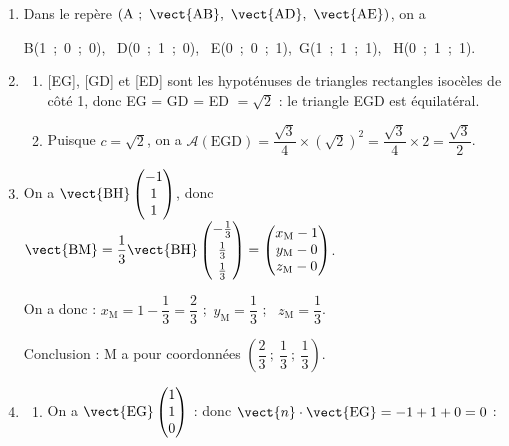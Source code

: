 \begin{enumerate}
\item 
Dans le repère $\left(\text{A}~;~\vect{\text{AB}},~\vect{\text{AD}},~\vect{\text{AE}}\right)$, on a 

B(1~;~0~;~0), \, D(0~;~1~;~0), \, E(0~;~0~;~1),\, G(1~;~1~;~1), \, H(0~;~1~;~1).
\item 
	\begin{enumerate}
		\item{}  
[EG], [GD] et [ED] sont les hypoténuses de triangles rectangles isocèles de côté 1, donc EG = GD = ED $= \sqrt{2}$ : le triangle EGD est équilatéral.
		\item 
		

Puisque $c = \sqrt{2}$, on a $\mathcal{A}(\text{EGD}) = \dfrac{\sqrt{3}}{4}\times \left(\sqrt{2}\right)^2 = \dfrac{\sqrt{3}}{4}\times 2 = \dfrac{\sqrt{3}}{2}$.
	\end{enumerate}
	
\item 

On a $\vect{\text{BH}}\begin{pmatrix}- 1\\1\\1\end{pmatrix}$, donc $\vect{\text{BM}} = \dfrac{1}{3}\vect{\text{BH}}\begin{pmatrix}- \frac{1}{3}\\[3pt]\frac{1}{3}\\[3pt]\frac{1}{3}\end{pmatrix} = \begin{pmatrix}x_{\text{M}} - 1\\y_{\text{M}}- 0\\z_{\text{M}}- 0\end{pmatrix}$.

On a donc : 
$x_{\text{M}} = 1 - \dfrac{1}{3} = \dfrac{2}{3}$ ;\,
$y_{\text{M}} = \dfrac{1}{3} $ ; \,
$z_{\text{M}} = \dfrac{1}{3}$.

Conclusion : M a pour coordonnées $\left(\dfrac{2}{3}~;~\dfrac{1}{3}~; ~\dfrac{1}{3}\right)$.
\item
	\begin{enumerate}
		\item 
		
On a $\vect{\text{EG}}\begin{pmatrix}1\\1\\0\end{pmatrix}$ : donc $\vect{n} \cdot \vect{\text{EG}} = - 1 +1 + 0 = 0$ :


\end{enumerate}
\end{enumerate}

